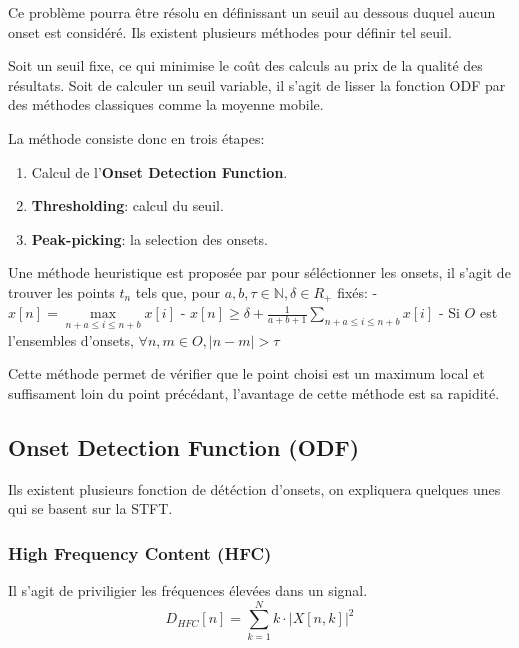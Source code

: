 \documentclass[]{article}
\providecommand{\tightlist}{%
  \setlength{\itemsep}{0pt}\setlength{\parskip}{0pt}}
\begin{document}
Ce problème pourra être résolu en définissant un seuil au dessous duquel
aucun onset est considéré. Ils existent plusieurs méthodes pour définir
tel seuil.

Soit un seuil fixe, ce qui minimise le coût des calculs au prix de la
qualité des résultats. Soit de calculer un seuil variable, il s'agit de
lisser la fonction ODF par des méthodes classiques comme la moyenne
mobile.

La méthode consiste donc en trois étapes:

\begin{enumerate}
\def\labelenumi{\arabic{enumi}.}
\tightlist
\item
  Calcul de l'\textbf{Onset Detection Function}.
\item
  \textbf{Thresholding}: calcul du seuil.
\item
  \textbf{Peak-picking}: la selection des onsets.
\end{enumerate}

Une méthode heuristique est proposée par \citep{ismir} pour séléctionner
les onsets, il s'agit de trouver les points \(t_n\) tels que, pour
\(a,b,\tau\in\mathbb{N}, \delta\in{R_+}\) fixés: -
\(x[n] = \max\limits_{n+a \leq i\leq n + b} x[i]\) -
\(x[n] \geq \delta + \frac{1}{a+b+1}\sum\limits_{n+a \leq i\leq n + b} x[i]\)
- Si \(O\) est l'ensembles d'onsets,
\(\forall n,m\in O, \lvert n - m \rvert > \tau\)

Cette méthode permet de vérifier que le point choisi est un maximum
local et suffisament loin du point précédant, l'avantage de cette
méthode est sa rapidité.

\hypertarget{onset-detection-function-odf}{%
\subsection{Onset Detection Function
(ODF)}\label{onset-detection-function-odf}}

Ils existent plusieurs fonction de détéction d'onsets, on expliquera
quelques unes qui se basent sur la STFT.

\hypertarget{high-frequency-content-hfc}{%
\subsubsection{High Frequency Content
(HFC)}\label{high-frequency-content-hfc}}

Il s'agit de priviligier les fréquences élevées dans un signal.
\[ D_{HFC}[n] = \sum\limits_{k=1}^{N}k\cdot\left\lvert X[n,k]\right\rvert^2 \]
\citep{hfc}
\end{document}
